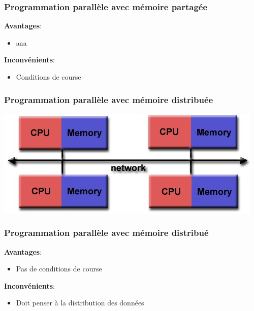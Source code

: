 \documentclass{beamer}
\begin{document}
\begin{frame}
\frametitle{Programmation parallèle avec mémoire partagée}
\begin{minipage}[t]{0.5\linewidth}
    \textbf{Avantages}:
    \begin{itemize}
    \item{aaa}
    \end{itemize}
    \end{minipage}%
    \begin{minipage}[t]{0.5\linewidth}
    \textbf{Inconvénients}:
    \begin{itemize}
    \item{Conditions de course}
    \end{itemize}
\end{minipage}
\end{frame}

\begin{frame}
\frametitle{Programmation parallèle avec mémoire distribuée}
\begin{center}
\includegraphics[scale=0.6]{distributedmem.jpg}
\end{center}
\end{frame}

\begin{frame}
\frametitle{Programmation parallèle avec mémoire distribué}
\begin{minipage}[t]{0.5\linewidth}
    \textbf{Avantages}:
    \begin{itemize}
    \item{Pas de conditions de course}
    \end{itemize}
    \end{minipage}%
    \begin{minipage}[t]{0.5\linewidth}
    \textbf{Inconvénients}:
    \begin{itemize}
    \item{Doit penser à la distribution des données}
    \end{itemize}
\end{minipage}
\end{frame}
\end{document}
